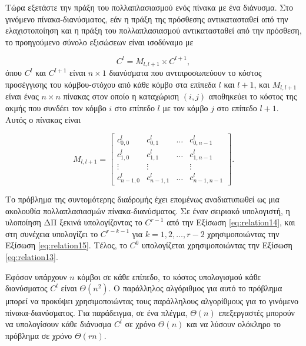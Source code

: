 \documentclass[12pt,a4paper]{article} %
\begin{document}
{{Τώρα εξετάστε την πράξη του πολλαπλασιασμού ενός πίνακα με ένα διάνυσμα. 
Στο γινόμενο πίνακα-διανύσματος, εάν η πράξη της πρόσθεσης αντικατασταθεί 
από την ελαχιστοποίηση και η πράξη του πολλαπλασιασμού αντικατασταθεί 
από την πρόσθεση, το προηγούμενο σύνολο εξισώσεων είναι ισοδύναμο με

\begin{equation}
C^l = M_{l,l+1} \times C^{l+1},
\label{eq:relation15}
\end{equation}
όπου $C^l$ και $C^{l+1}$ είναι $n \times 1$ διανύσματα που αντιπροσωπεύουν 
το κόστος προσέγγισης του κόμβου-στόχου από κάθε κόμβο στα επίπεδα $l$ 
και $l+1$, και $M_{l,l+1}$ είναι ένας $n \times n$ πίνακας στον οποίο η 
καταχώριση $(i, j)$ αποθηκεύει το κόστος της ακμής που συνδέει τον 
κόμβο $i$ στο επίπεδο $l$ με τον κόμβο $j$ στο επίπεδο $l+1$. Αυτός ο 
πίνακας είναι

$$
M_{l,l+1} = \begin{bmatrix}
c_{0,0}^l & c_{0,1}^l & \dots & c_{0,n-1}^l \\
c_{1,0}^l & c_{1,1}^l & \dots & c_{1,n-1}^l \\
\vdots & \vdots & & \vdots \\
c_{n-1,0}^l & c_{n-1,1}^l & \dots & c_{n-1,n-1}^l
\end{bmatrix}.
$$

Το πρόβλημα της συντομότερης διαδρομής έχει επομένως αναδιατυπωθεί ως 
μια ακολουθία πολλαπλασιασμών πίνακα-διανύσματος. Σε έναν σειριακό 
υπολογιστή, η υλοποίηση ΔΠ ξεκινά 
υπολογίζοντας το $C^{r-1}$ από την Εξίσωση \ref{eq:relation14}, και στη συνέχεια 
υπολογίζει το $C^{r-k-1}$ για $k = 1, 2, \dots, r - 2$ χρησιμοποιώντας 
την Εξίσωση \ref{eq:relation15}. Τέλος, το $C^0$ υπολογίζεται χρησιμοποιώντας την 
Εξίσωση \ref{eq:relation13}.

Εφόσον υπάρχουν $n$ κόμβοι σε κάθε επίπεδο, το κόστος υπολογισμού κάθε 
διανύσματος $C^l$ είναι $\Theta(n^2)$. Ο παράλληλος αλγόριθμος για αυτό 
το πρόβλημα μπορεί να προκύψει χρησιμοποιώντας τους παράλληλους 
αλγορίθμους για το γινόμενο πίνακα-διανύσματος. Για παράδειγμα, σε ένα πλέγμα, $\Theta(n)$ 
επεξεργαστές μπορούν να υπολογίσουν κάθε διάνυσμα $C^l$ σε χρόνο 
$\Theta(n)$ και να λύσουν ολόκληρο το πρόβλημα σε χρόνο $\Theta(rn)$.

}}
\end{document}
